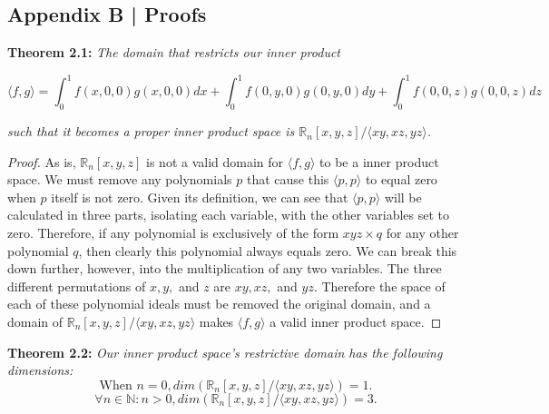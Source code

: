 \documentclass[letterpaper, 12pt]{article}
\begin{document}


\newpage

\begin{centering}\section*{Appendix B | Proofs}\end{centering}
		
\noindent \textbf{Theorem 2.1:} \textit{The domain that restricts our inner product}

\vspace*{-12mm}
$$\langle f, g\rangle = \int_0^1 f(x,0,0)g(x,0,0) dx + \int_0^1 f(0,y,0)g(0,y,0) dy + \int_0^1 f(0,0,z)g(0,0,z) dz$$

\vspace*{-4mm}
\noindent \textit{such that it becomes a proper inner product space is $\mathbb{R}_n [x, y, z] / \langle xy, xz, yz \rangle$.}

\vspace*{4mm}
	\begin{proof}
	As is, $\mathbb{R}_n [x, y, z]$ is not a valid domain for $\langle f, g\rangle$ to be a inner product space. We must remove any polynomials $p$ that cause this $\langle p, p\rangle$ to equal zero when $p$ itself is not zero. Given its definition, we can see that $\langle p, p\rangle$ will be calculated in three parts, isolating each variable, with the other variables set to zero. Therefore, if any polynomial is exclusively of the form $xyz \times q$ for any other polynomial $q$, then clearly this polynomial always equals zero. We can break this down further, however, into the multiplication of any two variables. The three different permutations of $x, y,$ and $z$ are $xy, xz,$ and $yz$. Therefore the space of each of these polynomial ideals must be removed the original domain, and a domain of $\mathbb{R}_n [x, y, z] / \langle xy, xz, yz \rangle$ makes $\langle f, g\rangle$ a valid inner product space.
	\end{proof}

\vspace*{2mm}
\noindent \textbf{Theorem 2.2:} \textit{Our inner product space's restrictive domain has the following dimensions:
	\vspace{-8mm}
	$$\text{When }n=0, dim(\mathbb{R}_n [x, y, z] / \langle xy, xz, yz\rangle) = 1.$$
	\vspace{-12mm}
	$$\forall n\in \mathbb{N} : n > 0, dim(\mathbb{R}_n [x, y, z] / \langle xy, xz, yz\rangle) = 3.$$}
\end{document}
